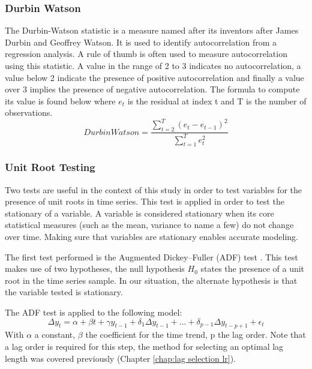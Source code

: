 \subsubsection{Durbin Watson}

The Durbin-Watson statistic is a measure named after its inventors after James Durbin and Geoffrey Watson. It is used to identify autocorrelation from a regression analysis. A rule of thumb is often used to measure autocorrelation using this statistic. A value in the range of 2 to 3 indicates no autocorrelation, a value below 2 indicate the presence of positive autocorrelation and finally a value over 3 implies the presence of negative autocorrelation. The formula to compute its value is found below where $e_{t}$ is the residual at index t and T is the number of observations.
\begin{equation}
    DurbinWatson = \frac{\sum_{t=2}^{T}(e_{t} - e_{t-1})^{2}}{\sum_{t=1}^{T}e_{t}^{2}}
\end{equation}

\subsubsection{Unit Root Testing}

Two tests are useful in the context of this study in order to test variables for the presence of unit roots in time series. This test is applied in order to test the stationary of a variable. A variable is considered stationary when  its core statistical measures (such as the mean, variance to name a few) do not change over time. Making sure that variables are stationary enables accurate modeling.

The first test performed is the Augmented Dickey–Fuller (ADF) test \citep{fuller2009introduction}. This test makes use of two hypotheses, the null hypothesis $H_0$ states the presence of a unit root in the time series sample. In our situation, the alternate hypothesis is that the variable tested is stationary.

The ADF test is applied to the following model:
\begin{equation}
    \Delta y_{t} = \alpha + \beta t + \gamma y_{t-1} + \delta_{1}\Delta y_{t-1} + ... + \delta_{p-1}\Delta y_{t-p+1} + \epsilon_{t} 
\end{equation}
With $\alpha$ a constant, $\beta$ the coefficient for the time trend, p the lag order. Note that a lag order is required for this step, the method for selecting an optimal lag length was covered previously (Chapter \ref{chap:lag selection lr}).

